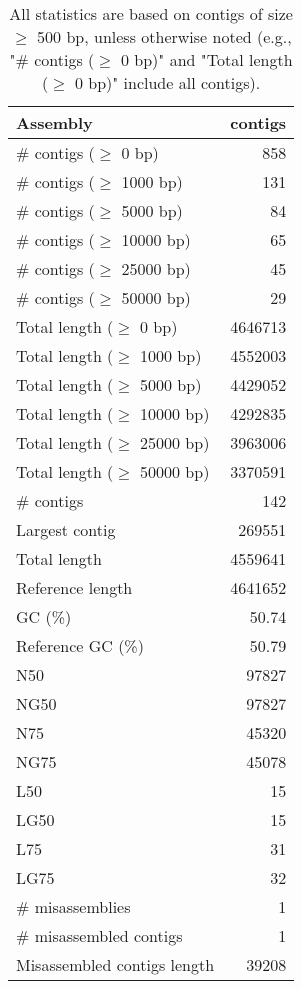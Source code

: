 \documentclass[12pt,a4paper]{article}
\begin{document}
\begin{table}[ht]
\begin{center}
\caption{All statistics are based on contigs of size $\geq$ 500 bp, unless otherwise noted (e.g., "\# contigs ($\geq$ 0 bp)" and "Total length ($\geq$ 0 bp)" include all contigs).}
\begin{tabular}{|l*{1}{|r}|}
\hline
Assembly & contigs \\ \hline
\# contigs ($\geq$ 0 bp) & 858 \\ \hline
\# contigs ($\geq$ 1000 bp) & 131 \\ \hline
\# contigs ($\geq$ 5000 bp) & 84 \\ \hline
\# contigs ($\geq$ 10000 bp) & 65 \\ \hline
\# contigs ($\geq$ 25000 bp) & 45 \\ \hline
\# contigs ($\geq$ 50000 bp) & 29 \\ \hline
Total length ($\geq$ 0 bp) & 4646713 \\ \hline
Total length ($\geq$ 1000 bp) & 4552003 \\ \hline
Total length ($\geq$ 5000 bp) & 4429052 \\ \hline
Total length ($\geq$ 10000 bp) & 4292835 \\ \hline
Total length ($\geq$ 25000 bp) & 3963006 \\ \hline
Total length ($\geq$ 50000 bp) & 3370591 \\ \hline
\# contigs & 142 \\ \hline
Largest contig & 269551 \\ \hline
Total length & 4559641 \\ \hline
Reference length & 4641652 \\ \hline
GC (\%) & 50.74 \\ \hline
Reference GC (\%) & 50.79 \\ \hline
N50 & 97827 \\ \hline
NG50 & 97827 \\ \hline
N75 & 45320 \\ \hline
NG75 & 45078 \\ \hline
L50 & 15 \\ \hline
LG50 & 15 \\ \hline
L75 & 31 \\ \hline
LG75 & 32 \\ \hline
\# misassemblies & 1 \\ \hline
\# misassembled contigs & 1 \\ \hline
Misassembled contigs length & 39208 \\ \hline

\end{tabular}
\end{center}
\end{table}
\end{document}
